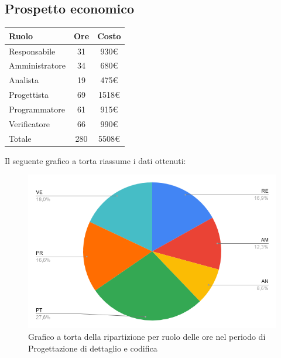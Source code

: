 {{{{{{{\subsection{Prospetto economico}\label{PreventivoFaseDiProgettazioneDiDettaglioECodificaProspettoEconomico}
\quad
\def\tabularxcolumn#1{m{#1}}
{
	\begin{center}
		\renewcommand{\arraystretch}{1.4}
		\begin{tabularx}{7cm}{|X|c|c|}
			\hline
			\rowcolor{airforceblue}
			\textbf{Ruolo} & \textbf{Ore} & \textbf{Costo}\\
			\hline
			Responsabile & 31 & 930\euro\\
			\hline
			Amministratore & 34 & 680\euro\\
			\hline
			Analista & 19 & 475\euro\\
			\hline
			Progettista & 69 & 1518\euro\\
			\hline
			Programmatore & 61 & 915\euro\\
			\hline
			Verificatore & 66 & 990\euro\\
			\hline
			Totale & 280 & 5508\euro\\
			\hline
		\end{tabularx}
	\end{center}

Il seguente grafico a torta riassume i dati ottenuti:
\begin{figure}[!ht]
	\begin{center}
		\includegraphics[width=0.8\linewidth]{../immagini/pdp/torta_progettazione_dettaglio.png}
		\caption{Grafico a torta della ripartizione per ruolo delle ore nel periodo di Progettazione
			di dettaglio e codifica}
	\end{center}
\end{figure}

}}}}}}}}
